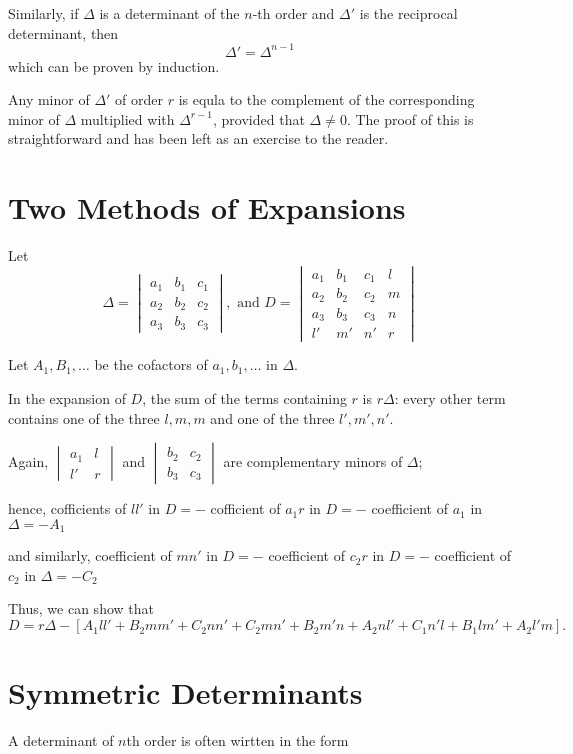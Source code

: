 Similarly, if $\Delta$ is a determinant of the $n$-th order and $\Delta'$ is the reciprocal determinant, then $$\Delta' = \Delta^{n
  - 1}$$ which can be proven by induction.

Any minor of $\Delta'$ of order $r$ is equla to the complement of the corresponding minor of $\Delta$ multiplied with $\Delta^{r -
  1}$, provided that $\Delta \neq 0$. The proof of this is straightforward and has been left as an exercise to the reader.

\section{Two Methods of Expansions}
Let $$\Delta = \begin{vmatrix}a_1 & b_1 & c_1\\a_2 & b_2 & c_2\\a_3 & b_3 & c_3\end{vmatrix}, \text{~and~} D= \begin{vmatrix}
    a_1 & b_1 & c_1 & l\\a_2 & b_2 & c_2 & m\\a_3 & b_3 & c_3 & n\\ l' & m' & n' & r
  \end{vmatrix}$$

Let $A_1, B_1, \ldots$ be the cofactors of $a_1, b_1, \ldots$ in $\Delta$.

In the expansion of $D$, the sum of the terms containing $r$ is $r\Delta$: every other term contains one of the three $l, m, m$ and
one of the three $l', m', n'$.

Again, $\begin{vmatrix}a_1 & l\\l' & r\end{vmatrix}$ and $\begin{vmatrix}b_2 & c_2\\b_3 & c_3\end{vmatrix}$ are complementary
minors of $\Delta$;

hence, cofficients of $ll'$ in $D = -$ cofficient of $a_1r$ in $D = -$ coefficient of $a_1$ in $\Delta = -A_1$

and similarly, coefficient of $mn'$ in $D = -$ coefficient of $c_2r$ in $D = -$ coefficient of $c_2$ in $\Delta = -C_2$

Thus, we can show that $$D = r\Delta - [A_1ll' + B_2mm' + C_2nn' + C_2mn' + B_2m'n + A_2nl' + C_1n'l + B_1lm' + A_2l'm].$$

\section{Symmetric Determinants}
A determinant of $n$th order is often wirtten in the form

